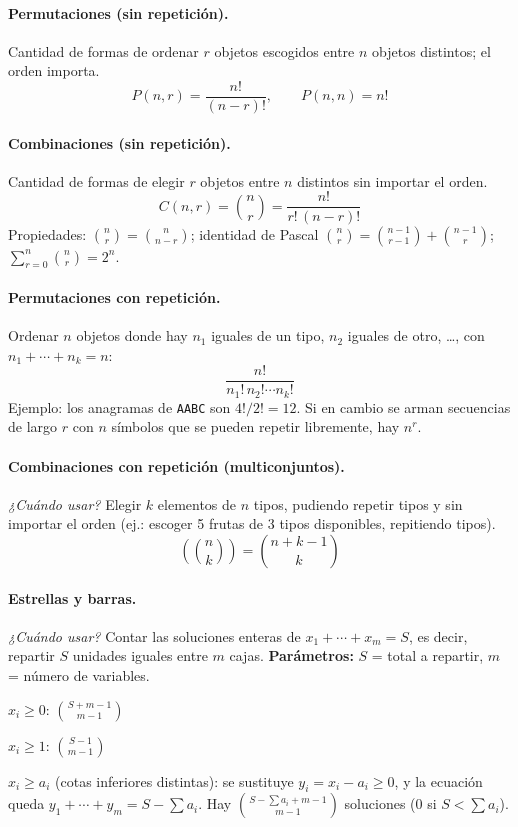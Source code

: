 \paragraph{Permutaciones (sin repetición).} Cantidad de formas de ordenar \(r\) objetos escogidos entre \(n\) objetos distintos; el orden importa.
\[
P(n,r)=\frac{n!}{(n-r)!}, \qquad P(n,n)=n!
\]

\paragraph{Combinaciones (sin repetición).} Cantidad de formas de elegir \(r\) objetos entre \(n\) distintos sin importar el orden.
\[
C(n,r)=\binom{n}{r}=\frac{n!}{r!\,(n-r)!}
\]
Propiedades: \(\binom{n}{r}=\binom{n}{n-r}\); identidad de Pascal \(\binom{n}{r}=\binom{n-1}{r-1}+\binom{n-1}{r}\); \(\sum_{r=0}^{n}\binom{n}{r}=2^n\).

\paragraph{Permutaciones con repetición.} Ordenar \(n\) objetos donde hay \(n_1\) iguales de un tipo, \(n_2\) iguales de otro, \dots, con \(n_1+\cdots+n_k=n\):
\[
\frac{n!}{n_1!\,n_2!\cdots n_k!}
\]
Ejemplo: los anagramas de \texttt{AABC} son \(4!/2! = 12\). Si en cambio se arman secuencias de largo \(r\) con \(n\) símbolos que se pueden repetir libremente, hay \(n^r\).

\paragraph{Combinaciones con repetición (multiconjuntos).} \textit{¿Cuándo usar?} Elegir \(k\) elementos de \(n\) tipos, pudiendo repetir tipos y sin importar el orden (ej.: escoger 5 frutas de 3 tipos disponibles, repitiendo tipos).
\[
\left(\!\!\binom{n}{k}\!\!\right) = \binom{n+k-1}{k}
\]

\paragraph{Estrellas y barras.} \textit{¿Cuándo usar?} Contar las soluciones enteras de \(x_1+\cdots+x_m=S\), es decir, repartir \(S\) unidades iguales entre \(m\) cajas. \textbf{Parámetros:} \(S\) = total a repartir, \(m\) = número de variables.
\begin{props}
  \item \(x_i \ge 0\): \(\displaystyle\binom{S+m-1}{m-1}\)
  \item \(x_i \ge 1\): \(\displaystyle\binom{S-1}{m-1}\)
  \item \(x_i \ge a_i\) (cotas inferiores distintas): se sustituye \(y_i = x_i - a_i \ge 0\), y la ecuación queda \(y_1+\cdots+y_m = S-\sum a_i\). Hay \(\displaystyle\binom{S-\sum a_i+m-1}{m-1}\) soluciones (0 si \(S<\sum a_i\)).
\end{props}


